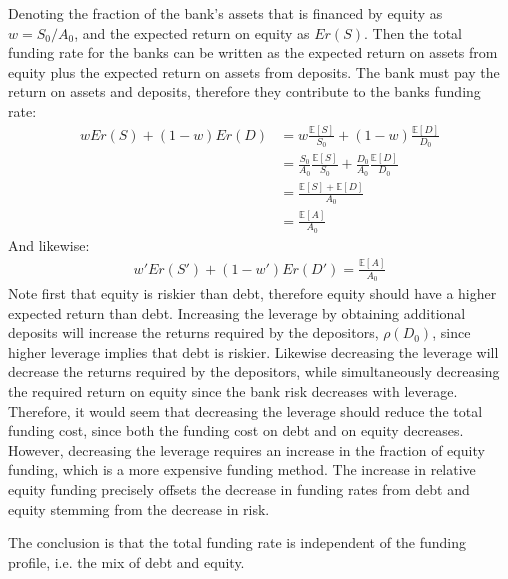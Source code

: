 \documentclass[10pt,a4paper]{article}
\begin{document}
        Denoting the fraction of the bank's assets that is financed by equity as $w = S_{0} / A_{0}$, and the expected return on equity as $Er(S)$. Then the total funding rate for the banks can be written as the expected return on assets from equity plus the expected return on assets from deposits. The bank must pay the return on assets and deposits, therefore they contribute to the banks funding rate:
            \begin{align}
                wEr(S) + (1-w)Er(D) 
                    &= w \frac{\mathbb{E}\left[S\right]}{S_{0}} + (1-w)\frac{\mathbb{E}\left[D\right]}{D_{0}} \\ 
                    &= \frac{S_{0}}{A_{0}} \frac{\mathbb{E}\left[S\right]}{S_{0}} + \frac{D_{0}}{A_{0}} \frac{\mathbb{E}\left[D\right]}{D_{0}} \\ 
                    &= \frac{\mathbb{E}\left[S\right] + \mathbb{E}\left[D\right]}{A_{0}} \\
                    &= \frac{\mathbb{E}\left[A\right]}{A_{0}}
            \end{align}
        And likewise:
            \begin{align}
                w'Er(S') + (1-w')Er(D') = \frac{\mathbb{E}\left[A\right]}{A_{0}}
            \end{align}
        Note first that equity is riskier than debt, therefore equity should have a higher expected return than debt. Increasing the leverage by obtaining additional deposits will increase the returns required by the depositors, $\rho(D_{0})$, since higher leverage implies that debt is riskier. Likewise decreasing the leverage will decrease the returns required by the depositors, while simultaneously decreasing the required return on equity since the bank risk decreases with leverage. Therefore, it would seem that decreasing the leverage should reduce the total funding cost, since both the funding cost on debt and on equity decreases. However, decreasing the leverage requires an increase in the fraction of equity funding, which is a more expensive funding method. The increase in relative equity funding precisely offsets the decrease in funding rates from debt and equity stemming from the decrease in risk. 

        The conclusion is that the total funding rate is independent of the funding profile, i.e. the mix of debt and equity. 
\end{document}
